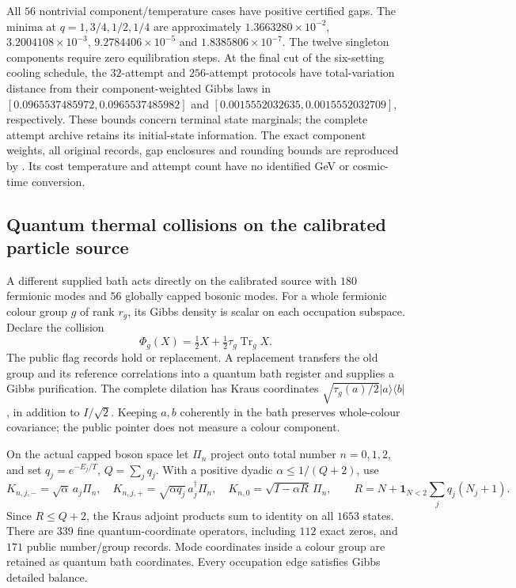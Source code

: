 All $56$ nontrivial component/temperature cases have positive certified
gaps. The minima at $q=1,3/4,1/2,1/4$ are approximately
$1.3663280\times10^{-2}$, $3.2004108\times10^{-3}$,
$9.2784406\times10^{-5}$ and $1.8385806\times10^{-7}$.
The twelve singleton components require zero equilibration steps.
At the final cut of the six-setting cooling schedule, the $32$-attempt
and $256$-attempt protocols have total-variation distance from their
component-weighted Gibbs laws in
$[0.0965537485972,0.0965537485982]$ and
$[0.0015552032635,0.0015552032709]$, respectively.
These bounds concern terminal state marginals; the complete attempt
archive retains its initial-state information. The exact component weights,
all original records, gap enclosures and rounding bounds are reproduced by
 \cite{ophrepo}. Its cost temperature and
attempt count have no identified GeV or cosmic-time conversion.

\subsection{Quantum thermal collisions on the calibrated particle source}

A different supplied bath acts directly on the calibrated source with
$180$ fermionic modes and $56$ globally capped bosonic modes. For a whole
fermionic colour group $g$ of rank $r_g$, its Gibbs density is scalar on
each occupation subspace. Declare the collision
\[
 \Phi_g(X)=\tfrac12X+\tfrac12\tau_g\operatorname{Tr}_g X.
\]
The public flag records hold or replacement. A replacement transfers the
old group and its reference correlations into a quantum bath register
and supplies a Gibbs purification. The complete dilation has Kraus
coordinates $\sqrt{\tau_g(a)/2}|a\rangle\langle b|$, in addition to
$I/\sqrt2$. Keeping $a,b$ coherently in the bath preserves whole-colour
covariance; the public pointer does not measure a colour component.

On the actual capped boson space let $\Pi_n$ project onto total number
$n=0,1,2$, and set $q_j=e^{-E_j/T}$, $Q=\sum_jq_j$. With a positive
dyadic $\alpha\leq1/(Q+2)$, use
\[
 K_{n,j,-}=\sqrt\alpha\,a_j\Pi_n,\quad
 K_{n,j,+}=\sqrt{\alpha q_j}\,a_j^\dagger\Pi_n,\quad
 K_{n,0}=\sqrt{I-\alpha R}\,\Pi_n,
 \qquad R=N+\mathbf1_{N<2}\sum_jq_j(N_j+1).
\]
Since $R\leq Q+2$, the Kraus adjoint products sum to identity on all
$1653$ states. There are $339$ fine quantum-coordinate operators,
including $112$ exact zeros, and $171$ public number/group records.
Mode coordinates inside a colour group are retained as quantum bath
coordinates. Every occupation edge satisfies Gibbs detailed balance.

